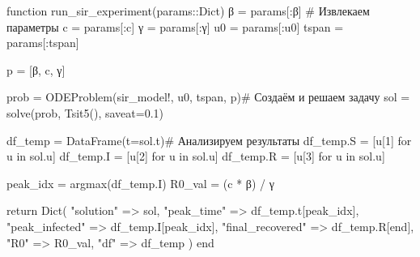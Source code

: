 \documentclass[
  12pt,
  a4paper,
  DIV=11,
  numbers=noendperiod]{scrreprt}
\newenvironment{Shaded}{\begin{snugshade}}{\end{snugshade}}
\newcommand{\CommentTok}[1]{\textcolor[rgb]{0.37,0.37,0.37}{#1}}
\newcommand{\ControlFlowTok}[1]{\textcolor[rgb]{0.00,0.23,0.31}{#1}}
\newcommand{\DataTypeTok}[1]{\textcolor[rgb]{0.68,0.00,0.00}{#1}}
\newcommand{\FloatTok}[1]{\textcolor[rgb]{0.68,0.00,0.00}{#1}}
\newcommand{\FunctionTok}[1]{\textcolor[rgb]{0.28,0.35,0.67}{#1}}
\newcommand{\KeywordTok}[1]{\textcolor[rgb]{0.00,0.23,0.31}{#1}}
\newcommand{\NormalTok}[1]{\textcolor[rgb]{0.00,0.23,0.31}{#1}}
\newcommand{\OperatorTok}[1]{\textcolor[rgb]{0.37,0.37,0.37}{#1}}
\newcommand{\StringTok}[1]{\textcolor[rgb]{0.13,0.47,0.30}{#1}}
\begin{document}
\begin{Shaded}
\begin{Highlighting}[]
\KeywordTok{function} \FunctionTok{run\_sir\_experiment}\NormalTok{(params}\OperatorTok{::}\DataTypeTok{Dict}\NormalTok{)}
\NormalTok{    β }\OperatorTok{=}\NormalTok{ params[}\OperatorTok{:}\NormalTok{β] }\CommentTok{\# Извлекаем параметры}
\NormalTok{    c }\OperatorTok{=}\NormalTok{ params[}\OperatorTok{:}\NormalTok{c]}
\NormalTok{    γ }\OperatorTok{=}\NormalTok{ params[}\OperatorTok{:}\NormalTok{γ]}
\NormalTok{    u0 }\OperatorTok{=}\NormalTok{ params[}\OperatorTok{:}\NormalTok{u0]}
\NormalTok{    tspan }\OperatorTok{=}\NormalTok{ params[}\OperatorTok{:}\NormalTok{tspan]}

\NormalTok{    p }\OperatorTok{=}\NormalTok{ [β, c, γ]}

\NormalTok{    prob }\OperatorTok{=} \FunctionTok{ODEProblem}\NormalTok{(sir\_model!, u0, tspan, p)}\CommentTok{\# Создаём и решаем задачу}
\NormalTok{    sol }\OperatorTok{=} \FunctionTok{solve}\NormalTok{(prob, }\FunctionTok{Tsit5}\NormalTok{(), saveat}\OperatorTok{=}\FloatTok{0.1}\NormalTok{)}

\NormalTok{    df\_temp }\OperatorTok{=} \FunctionTok{DataFrame}\NormalTok{(t}\OperatorTok{=}\NormalTok{sol.t)}\CommentTok{\# Анализируем результаты}
\NormalTok{    df\_temp.S }\OperatorTok{=}\NormalTok{ [u[}\FloatTok{1}\NormalTok{] for u }\KeywordTok{in}\NormalTok{ sol.u]}
\NormalTok{    df\_temp.I }\OperatorTok{=}\NormalTok{ [u[}\FloatTok{2}\NormalTok{] for u }\KeywordTok{in}\NormalTok{ sol.u]}
\NormalTok{    df\_temp.R }\OperatorTok{=}\NormalTok{ [u[}\FloatTok{3}\NormalTok{] for u }\KeywordTok{in}\NormalTok{ sol.u]}

\NormalTok{    peak\_idx }\OperatorTok{=} \FunctionTok{argmax}\NormalTok{(df\_temp.I)}
\NormalTok{    R0\_val }\OperatorTok{=}\NormalTok{ (c }\OperatorTok{*}\NormalTok{ β) }\OperatorTok{/}\NormalTok{ γ}

    \ControlFlowTok{return} \FunctionTok{Dict}\NormalTok{(}
        \StringTok{"solution"} \OperatorTok{=\textgreater{}}\NormalTok{ sol,}
        \StringTok{"peak\_time"} \OperatorTok{=\textgreater{}}\NormalTok{ df\_temp.t[peak\_idx],}
        \StringTok{"peak\_infected"} \OperatorTok{=\textgreater{}}\NormalTok{ df\_temp.I[peak\_idx],}
        \StringTok{"final\_recovered"} \OperatorTok{=\textgreater{}}\NormalTok{ df\_temp.R[}\KeywordTok{end}\NormalTok{],}
        \StringTok{"R0"} \OperatorTok{=\textgreater{}}\NormalTok{ R0\_val,}
        \StringTok{"df"} \OperatorTok{=\textgreater{}}\NormalTok{ df\_temp}
\NormalTok{    )}
\KeywordTok{end}
\end{Highlighting}
\end{Shaded}
\end{document}
